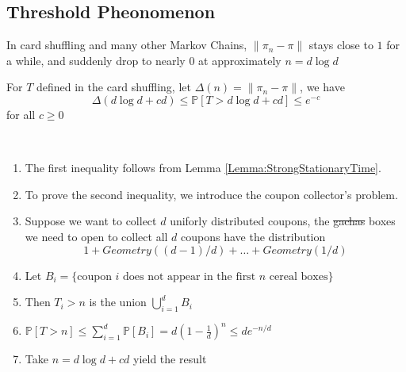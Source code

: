     \subsection{Threshold Pheonomenon}
        In card shuffling and many other Markov Chains, $\|\pi_n - \pi\|$ stays close to $1$ for a while, and suddenly drop to nearly $0$ at approximately $n = d\log{d}$

        \begin{theorem}
            For $T$ defined in the card shuffling, let $\Delta(n) = \|\pi_n - \pi\|$, we have
            \[ \Delta(d\log{d} + cd) \le \mathbb{P}[T > d\log{d} + cd] \le e^{-c} \]
            for all $c \ge 0$
        \end{theorem}
        \begin{sketchproof} ~{}
            \begin{enumerate}
                \item The first inequality follows from Lemma \ref{Lemma:StrongStationaryTime}.
                \item To prove the second inequality, we introduce the coupon collector's problem.
                \item Suppose we want to collect $d$ uniforly distributed coupons, the \sout{gachas} boxes we need to open to collect all $d$ coupons have the distribution
                \[ 1 + Geometry((d-1)/d) + \dots + Geometry(1/d) \]
                \item Let $B_i = \{ \text{coupon $i$ does not appear in the first $n$ cereal boxes} \}$
                \item Then $T_i > n$ is the union $\bigcup_{i=1}^dB_i$
                \item $\mathbb{P}[T>n] \le \sum_{i=1}^d\mathbb{P}[B_i] = d\left(1 - \frac{1}{d}\right)^n \le de^{-n/d}$
                \item Take $n = d\log{d} + cd$ yield the result
            \end{enumerate}
        \end{sketchproof}
